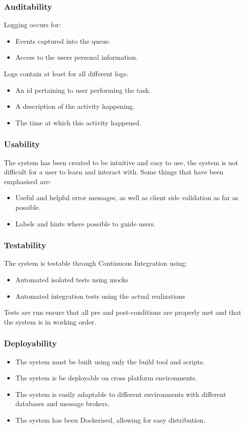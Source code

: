 \documentclass[11pt,a4paper]{article}
\begin{document}
\subsubsection{Auditability}
Logging occurs for:
\begin{itemize}
	\item Events captured into the queue.
	\item Access to the users personal information.
\end{itemize}
Logs contain at least for all different logs:
\begin{itemize}
	\item An id pertaining to user performing the task.
	\item A description of the activity happening.
	\item The time at which this activity happened.
\end{itemize}

\subsubsection{Usability}
The system has been created to be intuitive and easy to use, the system is not difficult for a user to learn and interact with. Some things that have been emphasised are:
\begin{itemize}
	\item Useful and helpful error messages, as well as client side validation as far as possible.
	\item Labels and hints where possible to guide users.
\end{itemize}

\subsubsection{Testability}
The system is testable through Continuous Integration using:  
\begin{itemize}
	\item Automated isolated tests using mocks
	\item Automated integration tests using the actual realizations 
\end{itemize}
Tests are run ensure that all pre and post-conditions are properly met and that the system is in working order.

\subsubsection{Deployability}
\begin{itemize}
	\item The system must be built using only the build tool and scripts.
	\item The system is be deployable on cross platform environments.
	\item The system is easily adaptable to different environments with different databases and message brokers.
	\item The system has been Dockerised, allowing for easy distribution. 
\end{itemize}
\end{document}
